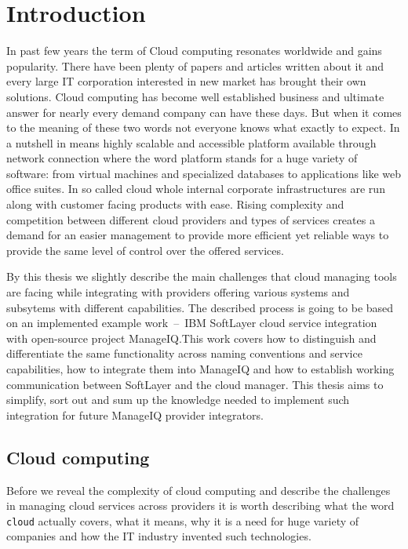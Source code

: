 
\chapter{Introduction}
\label{chap:Introduction}
In past few years the term of Cloud computing resonates worldwide and gains popularity. There have been plenty of papers and articles written about it and every large IT corporation interested in new market has brought their own solutions. Cloud computing has become well established business and ultimate answer for nearly every demand company can have these days. But when it comes to the meaning of these two words not everyone knows what exactly to expect. In a nutshell in means highly scalable and accessible platform available through network connection where the word platform stands for a huge variety of software: from virtual machines and specialized databases to applications like web office suites. In so called cloud whole internal corporate infrastructures are run along with customer facing products with ease. Rising complexity and competition between different cloud providers and types of services creates a demand for an easier management to provide more efficient yet reliable ways to provide the same level of control over the offered services.

By this thesis we slightly describe the main challenges that cloud managing tools are facing while integrating with providers offering various systems and subsytems with different capabilities. The described process is going to be based on an implemented example work \,--\, IBM SoftLayer cloud service integration with open-source project ManageIQ.\@ This work covers how to distinguish and differentiate the same functionality across naming conventions and service capabilities, how to integrate them into ManageIQ and how to establish working communication between SoftLayer and the cloud manager. This thesis aims to simplify, sort out and sum up the knowledge needed to implement such integration for future ManageIQ provider integrators.

\section{Cloud computing}
\label{sec:Cloud computing}
Before we reveal the complexity of cloud computing and describe the challenges in managing cloud services across providers it is worth describing what the word \texttt{cloud} actually covers, what it means, why it is a need for huge variety of companies and how the IT industry invented such technologies.

